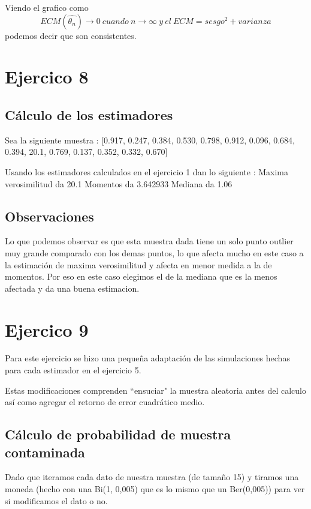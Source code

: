 \documentclass[a4paper]{article}
\begin{document}
Viendo el grafico como \[ECM(\hat{\theta_{n}}) \rightarrow 0 \ cuando \ n \rightarrow \infty \ y \ el\ ECM = sesgo^2 + varianza\] podemos decir que son consistentes. 

\section{Ejercico 8}
\subsection{Cálculo de los estimadores}
Sea la siguiente muestra : [0.917, 0.247, 0.384, 0.530, 0.798, 0.912, 0.096, 0.684, 0.394, 20.1, 0.769, 0.137, 0.352, 0.332, 0.670] \newline

Usando los estimadores calculados en el ejercicio 1 dan lo siguiente : \newline
Maxima verosimilitud da 20.1 \newline
Momentos da 3.642933 \newline
Mediana da 1.06 


\subsection{Observaciones}
Lo que podemos observar es que esta muestra dada tiene un solo punto outlier muy grande comparado con los demas puntos, lo que afecta mucho en este caso a la estimación de maxima verosimilitud y afecta en menor medida a la de momentos. Por eso en este caso elegimos el de la mediana que es la menos afectada y da una buena estimacion.
 
\section{Ejercico 9}
Para este ejercicio se hizo una pequeña adaptación de las simulaciones hechas para cada estimador en el ejercicio 5. 

Estas modificaciones comprenden ``ensuciar" la muestra aleatoria antes del calculo así como agregar el retorno de error cuadrático medio. 

\subsection{Cálculo de probabilidad de muestra contaminada}
Dado que iteramos cada dato de nuestra muestra (de tamaño 15) y tiramos una moneda (hecho con una Bi(1, 0,005) que es lo mismo que un Ber(0,005)) para ver si modificamos el dato o no. 
\end{document}
